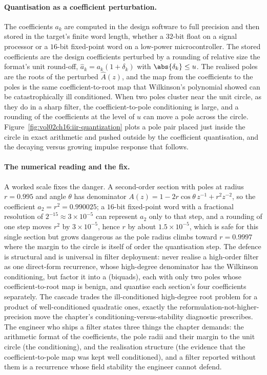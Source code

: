 \paragraph{Quantisation as a coefficient perturbation.}
The coefficients $a_{k}$ are computed in the design software to full
precision and then stored in the target's finite word length, whether a
$32$-bit float on a signal processor or a $16$-bit fixed-point word on a
low-power microcontroller. The stored coefficients are the design
coefficients perturbed by a rounding of relative size the format's unit
round-off, $\hat{a}_{k} = a_{k}(1 + \delta_{k})$ with $\abs{\delta_{k}} \leq
u$. The realised poles are the roots of the perturbed $\hat{A}(z)$, and the
map from the coefficients to the poles is the same coefficient-to-root map
that Wilkinson's polynomial showed can be catastrophically ill conditioned.
When two poles cluster near the unit circle, as they do in a sharp filter,
the coefficient-to-pole conditioning is large, and a rounding of the
coefficients at the level of $u$ can move a pole across the circle.
Figure~\ref{fig:vol02ch16:iir-quantization} plots a pole pair placed just
inside the circle in exact arithmetic and pushed outside by the coefficient
quantisation, and the decaying versus growing impulse response that follows.



\paragraph{The numerical reading and the fix.}
A worked scale fixes the danger. A second-order section with poles at radius
$r = 0.995$ and angle $\theta$ has denominator $A(z) = 1 - 2r\cos\theta\,
z^{-1} + r^{2} z^{-2}$, so the coefficient $a_{2} = r^{2} = 0.990025$; a
$16$-bit fixed-point word with a fractional resolution of $2^{-15} \approx 3
\times 10^{-5}$ can represent $a_{2}$ only to that step, and a rounding of one
step moves $r^{2}$ by $3 \times 10^{-5}$, hence $r$ by about $1.5 \times
10^{-5}$, which is safe for this single section but grows dangerous as the
pole radius climbs toward $r = 0.9997$ where the margin to the circle is
itself of order the quantisation step. The defence is structural and is
universal in filter deployment: never realise a high-order filter as one
direct-form recurrence, whose high-degree denominator has the Wilkinson
conditioning, but factor it into a 
(biquads), each with only two poles whose coefficient-to-root map is benign,
and quantise each section's four coefficients separately. The cascade trades
the ill-conditioned high-degree root problem for a product of well-conditioned
quadratic ones, exactly the reformulation-not-higher-precision move the
chapter's conditioning-versus-stability diagnostic prescribes. The engineer
who ships a filter states three things the chapter demands: the arithmetic
format of the coefficients, the pole radii and their margin to the unit
circle (the conditioning), and the realisation structure (the evidence that
the coefficient-to-pole map was kept well conditioned), and a filter reported
without them is a recurrence whose field stability the engineer cannot defend.

